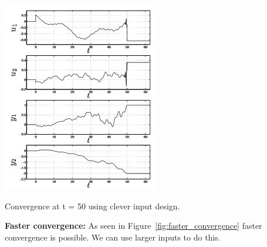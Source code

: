 \documentclass{../tufte-handout}
\begin{document}
\begin{marginfigure}
  \includegraphics[width=\linewidth]{fast_convergence}
  \caption{Convergence at t = 50 using clever input design. }
  \label{fig:fast_convergence}
\end{marginfigure}


\textbf{Faster convergence: } As seen in Figure~\ref{fig:faster_convergence} faster convergence is possible. We can use larger inputs to do this. 
\end{document}
